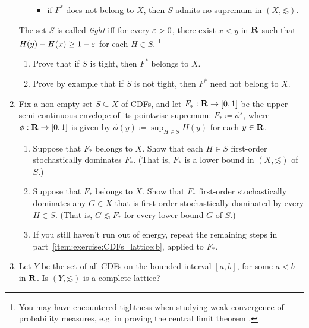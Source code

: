 \begin{exercise}
\begin{enumerate}[label=(\alph*),resume]
\begin{enumerate}[label=(\roman*)]
\begin{itemize}
				\item if $F^*$ does not belong to $X$, then $S$ admits no supremum in $(X,\mathord{\lesssim})$.
			
			\end{itemize}

		\end{enumerate}

		The set $S$ is called \emph{tight} iff for every $\varepsilon>0$, there exist $x<y$ in $\mathbf{R}$ such that $H(y)-H(x) \geq 1-\varepsilon$ for each $H \in S$.%
			\footnote{You may have encountered tightness when studying weak convergence of probability measures, e.g. in proving the central limit theorem \parencite[e.g.][chapter~11]{Rosenthal2006}.}

		\begin{enumerate}[label=(\roman*),resume]

			\item Prove that if $S$ is tight, then $F^*$ belongs to $X$.

			\item Prove by example that if $S$ is not tight, then $F^*$ need not belong to $X$.
		
		\end{enumerate}

		\item \label{item:exercise:CDFs_lattice:c} Fix a non-empty set $S \subseteq X$ of CDFs, and let $F_* : \mathbf{R} \to [0,1]$ be the upper semi-continuous envelope of its pointwise supremum: $F_* \coloneqq \phi^\star$, where $\phi : \mathbf{R} \to [0,1]$ is given by $\phi(y) \coloneqq \sup_{H \in S} H(y)$ for each $y \in \mathbf{R}$.

		\begin{enumerate}[label=(\roman*)]

			\item Suppose that $F_*$ belongs to $X$. Show that each $H \in S$ first-order stochastically dominates $F_*$. (That is, $F_*$ is a lower bound in $(X,\mathord{\lesssim})$ of $S$.)

			\item Suppose that $F_*$ belongs to $X$. Show that $F_*$ first-order stochastically dominates any $G \in X$ that is first-order stochastically dominated by every $H \in S$.
			(That is, $G \lesssim F_*$ for every lower bound $G$ of $S$.)

			\item If you still haven't run out of energy, repeat the remaining steps in part~\ref{item:exercise:CDFs_lattice:b}, applied to $F_*$.
		
		\end{enumerate}

		\item Let $Y$ be the set of all CDFs on the bounded interval $[a,b]$, for some $a<b$ in $\mathbf{R}$. Is $(Y,\mathord{\lesssim})$ is a complete lattice?
	
	\end{enumerate}
\end{exercise}



